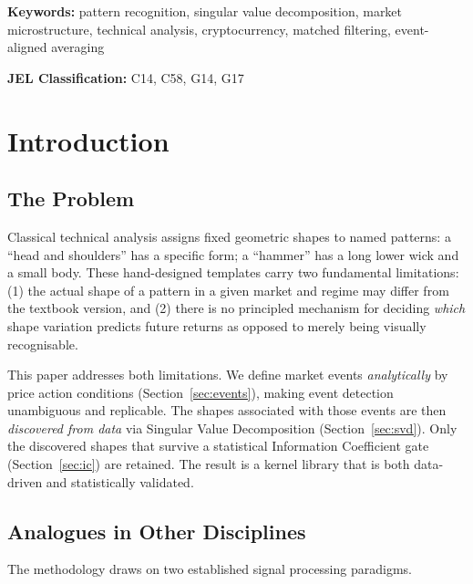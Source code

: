 \documentclass[11pt,a4paper]{article}
\theoremstyle{definition}
\theoremstyle{plain}
\begin{document}
\smallskip
\noindent\textbf{Keywords:} pattern recognition, singular value
decomposition, market microstructure, technical analysis, cryptocurrency,
matched filtering, event-aligned averaging

\smallskip
\noindent\textbf{JEL Classification:} C14, C58, G14, G17

\tableofcontents
\bigskip

\section{Introduction}
\label{sec:intro}

\subsection{The Problem}

Classical technical analysis assigns fixed geometric shapes to named
patterns: a ``head and shoulders'' has a specific form; a ``hammer'' has a
long lower wick and a small body. These hand-designed templates carry two
fundamental limitations: (1) the actual shape of a pattern in a given market
and regime may differ from the textbook version, and (2) there is no
principled mechanism for deciding \emph{which} shape variation predicts
future returns as opposed to merely being visually recognisable.

This paper addresses both limitations. We define market events
\emph{analytically} by price action conditions (Section~\ref{sec:events}),
making event detection unambiguous and replicable. The shapes associated
with those events are then \emph{discovered from data} via Singular Value
Decomposition (Section~\ref{sec:svd}). Only the discovered shapes that
survive a statistical Information Coefficient gate
(Section~\ref{sec:ic}) are retained. The result is a kernel library that
is both data-driven and statistically validated.

\subsection{Analogues in Other Disciplines}

The methodology draws on two established signal processing paradigms.
\end{document}
